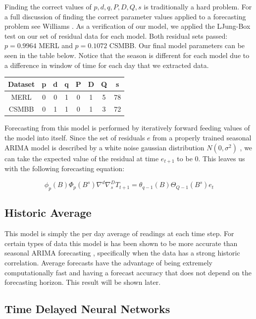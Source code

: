 \documentclass{acm_proc_article-sp}
\begin{document}
Finding the correct values of $p, d, q, P, D, Q, s$ is traditionally a hard problem.  For a full discussion of finding the correct parameter values applied to a forecasting problem see Williams \cite{Williams2003}.  As a verification of our model, we applied the LJung-Box test \cite{Ljung1978} on our set of residual data for each model. Both residual sets passed: $p = 0.9964$ MERL and $p = 0.1072$ CSMBB.  Our final model parameters can be seen in the table below.  Notice that the season is different for each model due to a difference in window of time for each day that we extracted data.

\begin{center}
\begin{tabular}{|c|c|c|c|c|c|c|c|} \hline
Dataset & p & d & q & P & D & Q & s\\ \hline
MERL & 0 & 0 & 1 & 0 & 1 & 5 & 78\\ \hline
CSMBB & 0 & 1 & 1 & 0 & 1 & 3 & 72\\ \hline
\end{tabular}
\end{center}

Forecasting from this model is performed by iteratively forward feeding values of the model into itself.  Since the set of residuals $e$ from a properly trained seasonal ARIMA model is described by a white noise gaussian distribution $N(0, \sigma^{2})$ , we can take the expected value of the residual at time $e_{t + 1}$ to be 0.  This leaves us with the following forecasting equation: 

\begin{equation}
\label{eq:sarima}
\phi_{p}(B)\Phi_{p}(B^{s})\nabla^{d}\nabla^{D}_{s}T_{t + 1} = \theta_{q - 1}(B)\Theta_{Q - 1}(B^{s})e_{t}
\end{equation}

\subsection{Historic Average}
This model is simply the per day average of readings at each time step.  For certain types of data this model is has been shown to be more accurate than seasonal ARIMA forecasting \cite{Newsham2010}, specifically when the data has a strong historic correlation.  Average forecasts have the advantage of being extremely computationally fast and having a forecast accuracy that does not depend on the forecasting horizon.  This result will be shown later.


\subsection{Time Delayed Neural Networks}
\end{document}
